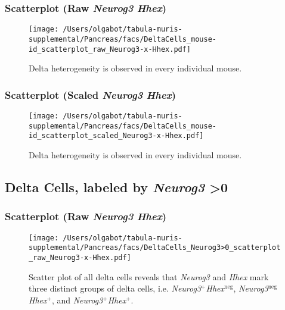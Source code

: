 \clearpage
\subsubsection{Scatterplot (Raw \emph{Neurog3} \texttimes \emph{Hhex})}
\begin{figure}[h]
\centering
\texttt{[image: /Users/olgabot/tabula-muris-supplemental/Pancreas/facs/DeltaCells\_mouse-id\_scatterplot\_raw\_Neurog3-x-Hhex.pdf]}

\caption{Delta heterogeneity is observed in every individual mouse.
}
\end{figure}


\clearpage

\subsubsection{Scatterplot (Scaled \emph{Neurog3} \texttimes \emph{Hhex})}
\begin{figure}[h]
\centering
\texttt{[image: /Users/olgabot/tabula-muris-supplemental/Pancreas/facs/DeltaCells\_mouse-id\_scatterplot\_scaled\_Neurog3-x-Hhex.pdf]}

\caption{Delta heterogeneity is observed in every individual mouse.
}
\end{figure}


\clearpage

\subsection{Delta Cells, labeled by \emph{Neurog3} \textgreater 0}

\clearpage
\subsubsection{Scatterplot (Raw \emph{Neurog3} \texttimes \emph{Hhex})}
\begin{figure}[h]
\centering
\texttt{[image: /Users/olgabot/tabula-muris-supplemental/Pancreas/facs/DeltaCells\_Neurog3>0\_scatterplot\_raw\_Neurog3-x-Hhex.pdf]}

\caption{Scatter plot of all delta cells reveals that \emph{Neurog3} and \emph{Hhex} mark three distinct groups of
delta cells, i.e. \emph{Neurog3}$^+$\emph{Hhex}$^\text{neg}$, \emph{Neurog3}$^\text{neg}$\emph{Hhex}$^+$, and \emph{Neurog3}$^+$\emph{Hhex}$^+$.
}
\end{figure}


\clearpage

